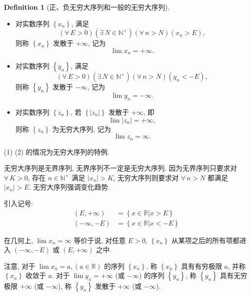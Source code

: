 \documentclass{book}
\newcommand{\Exists}{\exists\,}
\newcommand{\Any}{\forall\,}
\newcommand{\set}[1]{\left\{#1\right\}}
\newcommand{\abs}[1]{\left\lvert #1 \right\rvert}
\newcommand{\R}{\mathbb{R}}
\newcommand{\N}{\mathbb{N}}
\numberwithin{equation}{section}
\numberwithin{figure}{section}
\theoremstyle{definition}
\newtheorem{definition}{Definition}
\begin{document}
\begin{definition}[正、负无穷大序列和一般的无穷大序列]
  \leavevmode

  \begin{itemize}
    \item 对实数序列 $\set{x_n}$, 满足
      \begin{equation*}
	(\Any E>0)(\Exists N\in\N^+)(\Any n>N)(x_n>E),
      \end{equation*}
      则称 $\set{x_n}$ 发散于 $+\infty$, 记为
      \begin{equation*}
	\lim x_n=+\infty.
      \end{equation*}
    \item 对实数序列 $\set{y_n}$, 满足
      \begin{equation*}
	(\Any E>0)(\Exists N\in\N^+)(\Any n>N)(y_n<-E),
      \end{equation*}
      则称 $\set{y_n}$ 发散于 $-\infty$, 记为
      \begin{equation*}
	\lim y_n=-\infty.
      \end{equation*}
    \item 对实数序列 $\set{z_n}$, 若 $\set{\abs{z_n}}$ 发散于 $+\infty$, 即
      \begin{equation*}
	\lim\abs{z_n}=+\infty,
      \end{equation*}
      则称 $\set{z_n}$ 为无穷大序列, 记为
      \begin{equation*}
	\lim z_n=\infty.
      \end{equation*}
  \end{itemize}
\end{definition}

(1) (2) 的情况为无穷大序列的特例.

无穷大序列是无界序列, 无界序列不一定是无穷大序列. 因为无界序列只要求对 $\Any K>0$, 存在 $n\in\N^+$ 满足 $\abs{x_n}>K$, 无穷大序列则要求对 $\Any n>N$ 都满足 $\abs{x_n}>E$. 无穷大序列强调变化趋势.

引入记号:
\begin{align*}
  (E,+\infty)&=\set{x\in\R|x>E}\\
  (-\infty,-E)&=\set{x\in\R|x<-E}
\end{align*}

在几何上, $\lim x_n=\infty$ 等价于说, 对任意 $E>0$, $\set{x_n}$ 从某项之后的所有项都进入 $(-\infty,-E)$ 或 $(E,+\infty)$ 之中.

注意, 对于 $\lim x_n=a,(a\in\R)$ 的序列 $\set{x_n}$, 称 $\set{x_n}$ 具有有穷极限 $a$, 并称 $\set{x_n}$ 收敛于 $a$.
对于 $\lim y_n=+\infty$ (或 $-\infty$) 的序列 $\set{y_n}$, 称 $\set{y_n}$ 具有无穷极限 $+\infty$ (或 $-\infty$), 称 $\set{y_n}$ 发散于 $+\infty$ (或 $-\infty$).
\end{document}
